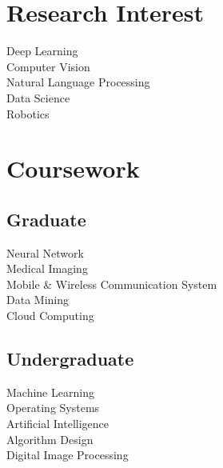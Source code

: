 \documentclass[]{deedy-resume-openfont}
\begin{document}
\begin{minipage}[t]{0.33\textwidth}
\section{Research Interest}
Deep Learning \\
Computer Vision \\
Natural Language Processing \\
Data Science \\
Robotics
\sectionsep


\section{Coursework}
\subsection{Graduate}
Neural Network \\
Medical Imaging \\
Mobile \& Wireless Communication System \\
Data Mining \\
Cloud Computing \\
\sectionsep

\subsection{Undergraduate}
Machine Learning \\
Operating Systems \\
Artificial Intelligence \\
Algorithm Design \\
Digital Image Processing \\
\sectionsep



\end{minipage}
\end{document}
